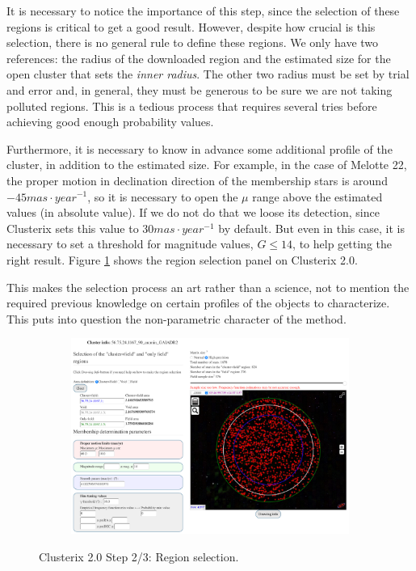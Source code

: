\documentclass[11pt, a4paper, english]{book}
\begin{document}
It is necessary to notice the importance of this step, since the selection of these regions is critical to get a good result.
However, despite how crucial is this selection, there is no general rule to define these regions.
We only have two references: the radius of the downloaded region and the estimated size for the open cluster that sets the \emph{inner radius}.
The other two radius must be set by trial and error and, in general, they must be generous to be sure we are not taking polluted regions.
This is a tedious process that requires several tries before achieving good enough probability values.

Furthermore, it is necessary to know in advance some additional profile of the cluster, in addition to the estimated size.
For example, in the case of Melotte 22, the proper motion in declination direction of the membership stars is around $-45 mas \cdot year^{-1}$,
so it is necessary to open the $\mu$ range above the estimated values (in absolute value). If we do not do that we loose its detection,
since Clusterix sets this value to $30 mas \cdot year^{-1}$ by default. But even in this case, it is necessary to set a threshold for
magnitude values, $G \leq 14$, to help getting the right result.
Figure \ref{fig:clusterix_step2_melotte_22} shows the region selection panel on Clusterix 2.0.

This makes the selection process an art rather than a science, not to mention the required previous knowledge on certain profiles of the
objects to characterize. This puts into question the non-parametric character of the method.

\begin{figure}[htbp]
  \centering
  \begin{subfigure}{0.9\textwidth}
    \centering
    \includegraphics[width=\textwidth]{../figures/clusterix/clusterix_step2_melotte_22.png}
  \end{subfigure}
  \caption{Clusterix 2.0 Step 2/3: Region selection.}
  \label{fig:clusterix_step2_melotte_22}
\end{figure}
\end{document}
